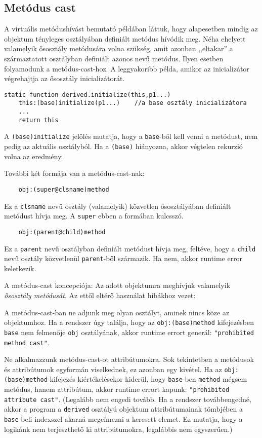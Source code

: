 \subsection{Metódus cast}

A virtuális metódushívást bemutató példában láttuk, 
hogy alapesetben mindig az objektum tényleges osztályában definiált metódus
hívódik meg. Néha ehelyett valamelyik ősosztály metódusára volna szükség,
amit azonban ,,eltakar'' a származtatott osztályban definiált azonos nevű
metódus. Ilyen esetben folyamodunk a metódus-cast-hoz.
A leggyakoribb példa, amikor az inicializátor végrehajtja
az ősosztály inicializátorát.
\begin{verbatim}
static function derived.initialize(this,p1...)
    this:(base)initialize(p1...)    //a base osztály inicializátora
    ...
    return this
\end{verbatim}
A \verb!(base)initialize! jelölés mutatja, hogy a \verb!base!-ből
kell venni a metódust, nem pedig az aktuális osztályból. 
Ha a \verb!(base)! hiányozna, akkor végtelen rekurzió volna az eredmény.

További két formája van a metódus-cast-nak:
\begin{verbatim}
    obj:(super@clsname)method
\end{verbatim}
Ez a \verb!clsname! nevű osztály (valamelyik) közvetlen ősosztályában
definiált metódust hívja meg. A \verb!super! ebben a formában kulcsszó.

\begin{verbatim}
    obj:(parent@child)method
\end{verbatim}
Ez a \verb!parent! nevű osztályban definiált metódust hívja meg,
feltéve, hogy a \verb!child! nevű osztály közvetlenül \verb!parent!-ből
származik. Ha nem, akkor runtime error keletkezik.


A metódus-cast koncepciója: Az adott objektumra meghívjuk valamelyik 
{\em ősosztály metódusát}. Az ettől eltérő használat hibákhoz vezet:

 A metódus-cast-ban ne adjunk meg olyan osztályt, 
 aminek nincs köze az objektumhoz. Ha a rendszer úgy találja, hogy
 az \verb!obj:(base)method! kifejezésben \verb!base! nem felmenője
 \verb!obj! osztályának, akkor runtime errort generál: 
 \verb!"prohibited method cast"!.

 Ne alkalmazzunk metódus-cast-ot attribútumokra. 
 Sok tekintetben a metódusok és attribútumok
 egyformán viselkednek, ez azonban egy kivétel.
 Ha az \verb!obj:(base)method! kifejezés kiértékelésekor kiderül, 
 hogy \verb!base!-ben \verb!method! mégsem metódus, hanem attribútum, 
 akkor runtime errort kapunk: \verb!"prohibited attribute cast"!.
 (Legalább nem engedi tovább. Ha a rendszer továbbengedné, akkor 
 a program a \verb!derived!  osztályú objektum attribútumainak tömbjében 
 a \verb!base!-beli indexszel akarná megcímezni a keresett elemet.
 Ez mutatja, hogy a logikánk nem terjeszthető ki attribútumokra,
 legalábbis nem egyszerűen.)







